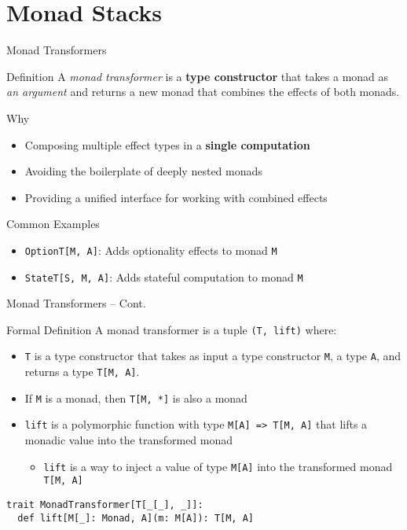 \documentclass[presentation, 10pt]{beamer}\mode<presentation>{\usetheme{metropolis}}
\begin{document}
\section{Monad Stacks}
\begin{frame}{Monad Transformers}
\begin{exampleblock}{Definition}
A \emph{monad transformer} is a \textbf{type constructor} that takes a monad as \emph{an argument} and returns a new monad that combines the effects of both monads.
\end{exampleblock}
\begin{alertblock}{Why}
	\begin{itemize}
		\item Composing multiple effect types in a \textbf{single computation}
		\item Avoiding the boilerplate of deeply nested monads
		\item Providing a unified interface for working with combined effects
	\end{itemize}
\end{alertblock}
\begin{exampleblock}{Common Examples}
	\begin{itemize}
		\item \texttt{OptionT[M, A]}: Adds optionality effects to monad \texttt{M}
		\item \texttt{StateT[S, M, A]}: Adds stateful computation to monad \texttt{M}
	\end{itemize}
\end{exampleblock}
\end{frame}
\begin{frame}[fragile]{Monad Transformers -- Cont.}
\begin{alertblock}{Formal Definition}
	A monad transformer is a tuple \texttt{(T, lift)} where:
	\begin{itemize}
		\item \texttt{T} is a type constructor that takes as input a type constructor \texttt{M}, a type \texttt{A}, and returns a type \texttt{T[M, A]}.
		\item If \texttt{M} is a monad, then \texttt{T[M, *]} is also a monad
		\item \texttt{lift} is a polymorphic function with type \texttt{M[A] => T[M, A]} that lifts a monadic value into the transformed monad
		\begin{itemize}
			\item \texttt{lift} is a way to inject a value of type \texttt{M[A]} into the transformed monad \texttt{T[M, A]}
		\end{itemize}
	\end{itemize}
\end{alertblock}
\begin{tcolorbox}
\begin{verbatim}
trait MonadTransformer[T[_[_], _]]:
  def lift[M[_]: Monad, A](m: M[A]): T[M, A]
\end{verbatim}
\end{tcolorbox}
\end{frame}
\end{document}
